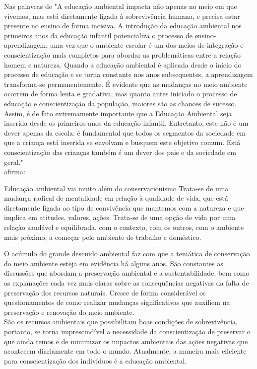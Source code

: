 Nas palavras de  "A educação ambiental impacta não apenas no meio em que vivemos, mas está diretamente ligada à
sobrevivência humana, e precisa estar presente no ensino de forma incisiva.
A introdução da educação ambiental nos primeiros anos da educação infantil potencializa o
processo de ensino-aprendizagem, uma vez que o ambiente escolar é um dos meios de integração e
conscientização mais completos para abordar as problemáticas entre a relação homem e natureza.
Quando a educação ambiental é aplicada desde o início do processo de educação e se torna
constante nos anos subsequentes, a aprendizagem transforma-se permanentemente.
É evidente que as mudanças no meio ambiente ocorrem de forma lenta e gradativa, mas quanto
antes iniciado o processo de educação e conscientização da população, maiores são as chances de
sucesso. Assim, é de fato extremamente importante que a Educação Ambiental seja inserida desde
os primeiros anos da educação infantil.
Entretanto, este não é um dever apenas da escola: é fundamental que todos os segmentos da
sociedade em que a criança está inserida se envolvam e busquem este objetivo comum. Está
conscientização das crianças também é um dever dos pais e da sociedade em geral."\\

 afirma:

\begin{citacao}
    Educação ambiental vai muito além do conservacionismo Trata-se de uma mudança radical de mentalidade em relação à qualidade de vida, que está diretamente ligada ao tipo de convivência que mantemos com a natureza e que implica em atitudes, valores, ações. Trata-se de uma opção de vida por uma relação saudável e equilibrada, com o contexto, com os outros, com o ambiente mais próximo, a começar pelo ambiente de trabalho e doméstico.
\end{citacao}

O acúmulo do grande descuido ambiental faz com que a temática de conservação do meio ambiente esteja em evidência há alguns anos. São constantes as discussões que abordam a preservação ambiental e a sustentabilidade, bem como as explanações cada vez mais claras sobre as consequências negativas da falta de preservação dos recursos naturais. Cresce de forma considerável os questionamentos de como realizar mudanças significativas que auxiliem na preservação e renovação do meio ambiente.\\

São os recursos ambientais que possibilitam boas condições de sobrevivência, portanto, se torna imprescindível a necessidade da conscientização de preservar o que ainda temos e de minimizar os impactos ambientais das ações negativas que acontecem diariamente em todo o mundo.  Atualmente, a maneira mais eficiente para conscientização dos indivíduos é a educação ambiental.\\

